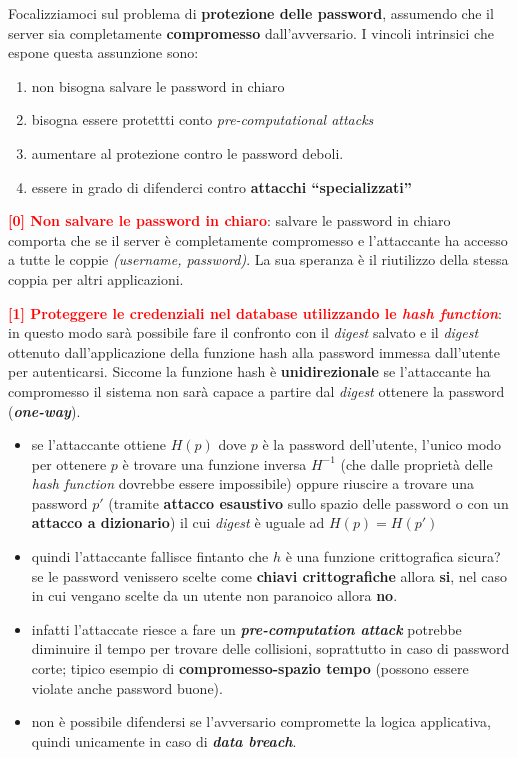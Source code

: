 \begin{flushleft}
    Focalizziamoci sul problema di \textbf{protezione delle password}, assumendo che il server sia completamente \textbf{compromesso} dall'avversario. I vincoli intrinsici che espone questa assunzione sono:
    \begin{enumerate}[nosep, start=0]
        \item non bisogna salvare le password in chiaro
        \item bisogna essere protettti conto \textit{pre-computational attacks}
        \item aumentare al protezione contro le password deboli.
        \item essere in grado di difenderci contro \textbf{attacchi ``specializzati''}
    \end{enumerate}

    \medskip

    \textcolor{red}{\textbf{[0] Non salvare le password in chiaro}}: salvare le password in chiaro comporta che se il server è completamente compromesso e l'attaccante ha accesso a tutte le coppie \textit{(username, password)}. La sua speranza è il riutilizzo della stessa coppia per altri applicazioni.

    \smallskip

    \textcolor{red}{\textbf{[1] Proteggere le credenziali nel database utilizzando le \textit{hash function}}}: in questo modo sarà possibile fare il confronto con il \textit{digest} salvato e il \textit{digest} ottenuto dall'applicazione della funzione hash alla password immessa dall'utente per autenticarsi. Siccome la funzione hash è \textbf{unidirezionale} se l'attaccante ha compromesso il sistema non sarà capace a partire dal \textit{digest} ottenere la password (\textbf{\textit{one-way}}).
    \begin{itemize}[nosep]
        \item se l'attaccante ottiene $H(p)$ dove $p$ è la password dell'utente, l'unico modo per ottenere $p$ è trovare una funzione inversa $H^{-1}$ (che dalle proprietà delle \textit{hash function} dovrebbe essere impossibile) oppure riuscire a trovare una password $p'$ (tramite \textbf{attacco esaustivo} sullo spazio delle password o con un \textbf{attacco a dizionario}) il cui \textit{digest} è uguale ad $H(p) = H(p')$
        \item quindi l'attaccante fallisce fintanto che $h$ è una funzione crittografica sicura? se le password venissero scelte come \textbf{chiavi crittografiche} allora \textbf{si}, nel caso in cui vengano scelte da un utente non paranoico allora \textbf{no}.
        \item infatti l'attaccate riesce a fare un \textbf{\textit{pre-computation attack}} potrebbe diminuire il tempo per trovare delle collisioni, soprattutto in caso di password corte; tipico esempio di \textbf{compromesso-spazio tempo} (possono essere violate anche password buone).
        \item non è possibile difendersi se l'avversario compromette la logica applicativa, quindi unicamente in caso di \textbf{\textit{data breach}}.
    \end{itemize}
\end{flushleft}
